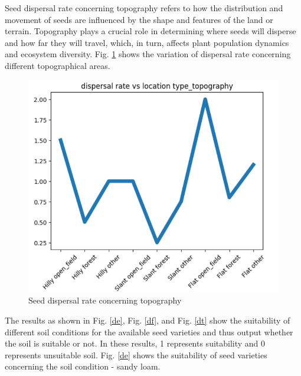 \documentclass[conference]{IEEEtran}
\begin{document}
Seed dispersal rate concerning topography refers to how the distribution and movement of seeds are influenced by the shape and features of the land or terrain. Topography plays a crucial role in determining where seeds will disperse and how far they will travel, which, in turn, affects plant population dynamics and ecosystem diversity. Fig. \ref{ds} shows the variation of dispersal rate concerning different topographical areas.
\begin{figure}[H]
    \centering
    \includegraphics[scale=0.4]{plot11.png}
    \caption{Seed dispersal rate concerning topography}
    \label{ds}
\end{figure}
The results as shown in Fig. \ref{de}, Fig. \ref{df}, and Fig. \ref{dt} show the suitability of different soil conditions for the available seed varieties and thus output whether the soil is suitable or not. In these results, 1 represents suitability and 0 represents unsuitable soil.
Fig. \ref{de} shows the suitability of seed varieties concerning the soil condition - sandy loam.
\end{document}
